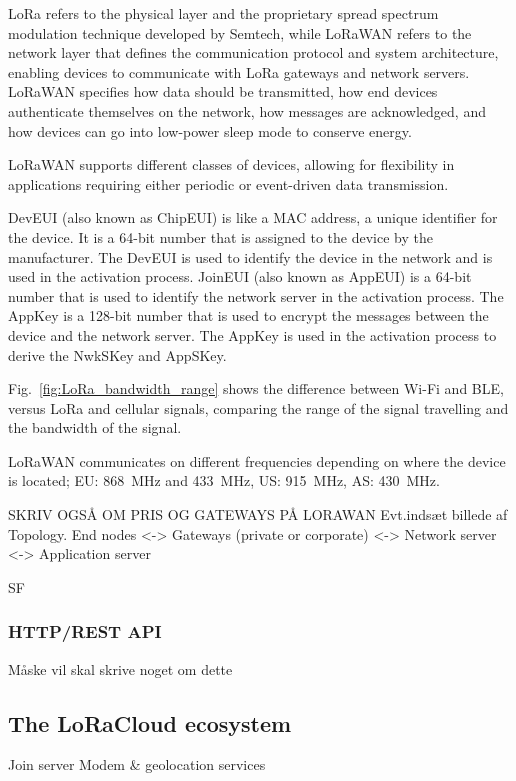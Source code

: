 \ac{LoRa} refers to the physical layer and the proprietary spread spectrum modulation technique developed by Semtech, while \ac{LoRaWAN} refers to the network layer that defines the communication protocol and system architecture, enabling devices to communicate with \ac{LoRa} gateways and network servers. \ac{LoRaWAN} specifies how data should be transmitted, how end devices authenticate themselves on the network, how messages are acknowledged, and how devices can go into low-power sleep mode to conserve energy.

\ac{LoRaWAN} supports different classes of devices, allowing for flexibility in applications requiring either periodic or event-driven data transmission.

\ac{DevEUI} (also known as ChipEUI) is like a \ac{MAC} address, a unique identifier for the device. It is a 64-bit number that is assigned to the device by the manufacturer. The \ac{DevEUI} is used to identify the device in the network and is used in the activation process. \ac{JoinEUI} (also known as AppEUI) is a 64-bit number that is used to identify the network server in the activation process. The \ac{AppKey} is a 128-bit number that is used to encrypt the messages between the device and the network server. The \ac{AppKey} is used in the activation process to derive the \ac{NwkSKey} and \ac{AppSKey}.



Fig.~\ref{fig:LoRa_bandwidth_range} shows the difference between Wi-Fi and \ac{BLE}, versus \ac{LoRa} and cellular signals, comparing the range of the signal travelling and the bandwidth of the signal.

\ac{LoRaWAN} communicates on different frequencies depending on where the device is located; EU: \SI{868}{\mega\hertz} and \SI{433}{\mega\hertz}, US: \SI{915}{\mega\hertz}, AS: \SI{430}{\mega\hertz}.

SKRIV OGSÅ OM PRIS OG GATEWAYS PÅ LORAWAN
Evt.indsæt billede af Topology. End nodes <-> Gateways (private or corporate) <-> Network server <-> Application server

\ac{SF}

\subsubsection{HTTP/REST API}
Måske vil skal skrive noget om dette

\subsection{The LoRaCloud ecosystem}
Join server
Modem \& geolocation services

